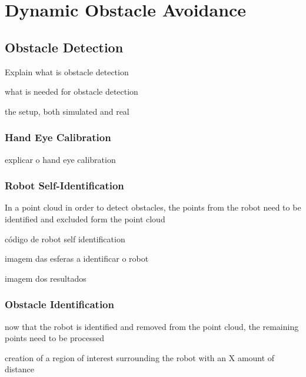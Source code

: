 \chapter{Dynamic Obstacle Avoidance}
\label{chapter:obstacle}

\section{Obstacle Detection}
\label{section:obstacle-detection}

\par Explain what is obstacle detection

\par what is needed for obstacle detection

\par the setup, both simulated and real 

\subsection{Hand Eye Calibration}

\par explicar o hand eye calibration

\subsection{Robot Self-Identification}

\par In a point cloud in order to detect obstacles, the points from the robot need to be identified and excluded form the point cloud

\par código de robot self identification

\par imagem das esferas a identificar o robot

\par imagem dos resultados

\subsection{Obstacle Identification}

\par now that the robot is identified and removed from the point cloud, the remaining points need to be processed

\par creation of a region of interest surrounding the robot with an X amount of distance

